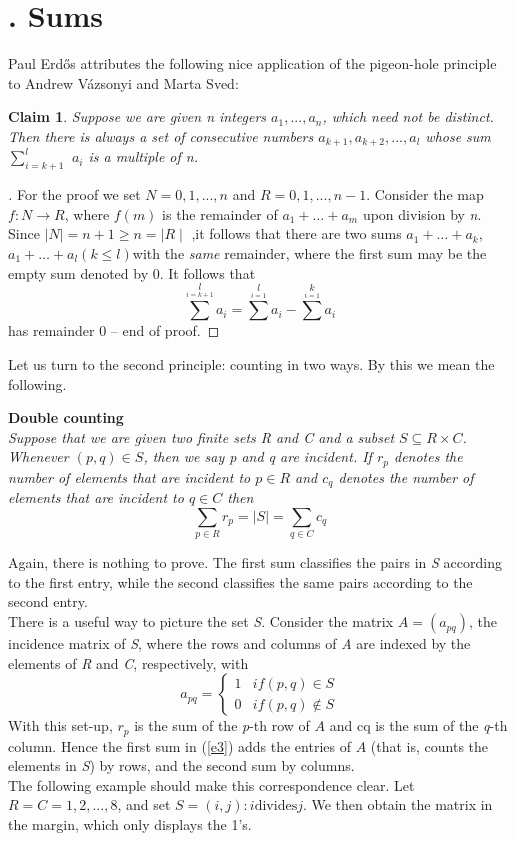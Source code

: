 \documentclass[10pt,twoside]{book}
\newcommand{\Font}[1]{\fontfamily{qhv}\selectfont #1}
\newtheorem*{claim}{Claim}
\begin{document}
		\section*{\Font{3. Sums}}
		Paul Erd\H{o}s attributes the following nice application of the pigeon-hole principle to Andrew Vázsonyi and Marta Sved:
		\begin{claim}
			Suppose we are given \textit{n} integers $a_1,...,a_n$, which need not be distinct. Then there is always a set of consecutive numbers $a_{k+1},a_{k+2},...,a_l$ whose sum $\sum^{l}_{i=k+1}$ $a_i$ is a multiple of n.
		\end{claim}
		\begin{proof}[\unskip\nopunct]
			For the proof we set $N = {0, 1,...,n}$ and $R = {0, 1,...,n-1}$. Consider the map $f : N \rightarrow R$, where $f(m)$ is the remainder of $a_1 +\dots+a_m$ upon division by \textit{n}. Since $\mid N\mid = n + 1 \ge n = \mid R\mid$ ,it follows that there are two sums $a_1 +\dots+ a_k$, $a_1 +\dots+a_l (k \le l)$with the \textit{same} remainder, where the ﬁrst sum may be the empty sum denoted by 0. It follows that
			$$\sum^{l}\limits_{i=k+1}a_i = \sum^{l}\limits_{i=1}a_i - \sum^{k}\limits_{i=1}a_i$$
			has remainder 0 -- end of proof.
		\end{proof}
		Let us turn to the second principle: counting in two ways. By this we mean the following.
		\begin{tcolorbox}[leftrule=3mm]
			\textbf{Double counting}\\
			\textit{
			Suppose that we are given two finite sets R and C and a subset $S \subseteq R \times C$. Whenever $(p, q)\in S$, then we say p and q are incident. If $r_p$ denotes the number of elements that are incident to $p \in R$ and $c_q$ denotes the number of elements that are incident to $q \in C$ then
			\begin{equation*}
				\sum\limits_{p \in R}r_p = \mid S\mid = \sum\limits_{q \in C}c_q \tag{3} \label{e3}
			\end{equation*}
			}
		\end{tcolorbox}
		Again, there is nothing to prove. The ﬁrst sum classiﬁes the pairs in \textit{S} according to the ﬁrst entry, while the second classiﬁes the same pairs according to the second entry.\\
		There is a useful way to picture the set \textit{S}. Consider the matrix $A = (a_{pq})$, the incidence matrix of \textit{S}, where the rows and columns of \textit{A} are indexed by the elements of \textit{R} and \textit{C}, respectively, with
		$$a_{pq} = \begin{cases} 
			1 & if(p,q)\in S\\
			0 & if(p,q)\notin S
		\end{cases}
		$$
		With this set-up, $r_p$ is the sum of the \textit{p}-th row of $A$ and cq is the sum of the \textit{q}-th column. Hence the ﬁrst sum in (\ref{e3}) adds the entries of $A$ (that is, counts the elements in \textit{S}) by rows, and the second sum by columns.\\
		The following example should make this correspondence clear. Let $R = C = {1, 2,...,8}$, and set $S = {(i, j) :i \text{divides} j}$. We then obtain the matrix in the margin, which only displays the 1’s.
\end{document}
